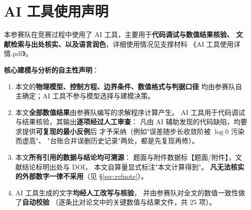 
\section*{AI 工具使用声明}

本参赛队在竞赛过程中使用了 AI 工具，主要用于\textbf{代码调试与数值结果核验、
文献检索与出处核实、以及语言润色}，详细使用情况见支撑材料
《AI 工具使用详情.pdf》。

\vspace{2pt}
\noindent\textbf{核心建模与分析的自主性声明}：

\begin{enumerate}[leftmargin=2.2em, itemsep=2pt]
  \item 本文的\textbf{物理模型、控制方程、边界条件、数值格式与判据口径}
        均由参赛队自主确定；AI 工具不参与模型选择与建模决策。
  \item 本文\textbf{全部数值结果}由参赛队编写的求解程序计算产生。
        AI 工具用于代码调试与结果核验，其输出\textbf{逐项经过人工审查}：
        凡由 AI 辅助发现的代码缺陷，均要求提供\textbf{可复现的最小反例}后
        才予采纳（例如"误差随步长收敛阶被 $\log 0$ 污染而虚高"、
        "台账合并误删历史记录"两处，都是先复现再修）。
  \item 本文\textbf{所有引用的数据与结论均可溯源}：
        题面与附件数据标【题面/附件】，文献结论标明出处与 DOI，
        本文自算量显式标注"本文计算得到"。
        \textbf{凡无法核实的外部数字一律不采用}（见 \S\ref{sec:refnote}）。
  \item AI 工具生成的文字\textbf{均经人工改写与核验}，
        并由参赛队对全文的数值一致性做了\textbf{自动校验}
        （逐条比对论文中的关键数值与结果文件，共 25 项）。
\end{enumerate}
